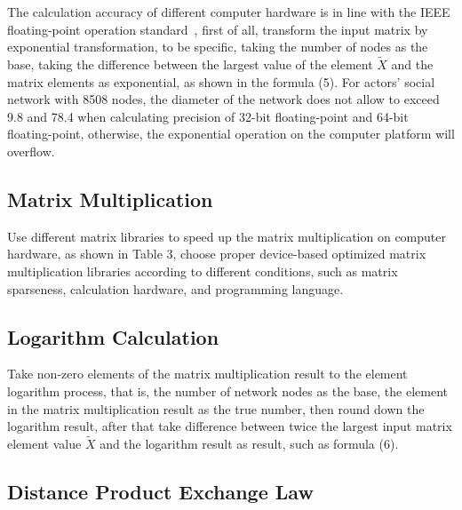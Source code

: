 \documentclass[review]{cvpr}
\begin{document}
The calculation accuracy of different computer hardware is in line with the IEEE floating-point operation standard~\cite{ieee1985ieee},
first of all, transform the input matrix by exponential transformation, to be specific, taking the number of nodes as the base,
taking the difference between the largest value of the element $\widetilde X$ and the matrix elements as exponential, as shown in the formula (5).
\eg For actors' social network with 8508 nodes, the diameter of the network does not allow to exceed 9.8 and 78.4 when calculating precision of 32-bit floating-point and 64-bit floating-point,
otherwise, the exponential operation on the computer platform will overflow.

\subsection{Matrix Multiplication}
Use different matrix libraries to speed up the matrix multiplication on computer hardware, as shown in Table 3, choose proper device-based optimized matrix multiplication libraries according to different conditions, such as matrix sparseness, calculation hardware, and programming language.

\subsection{Logarithm Calculation}
Take non-zero elements of the matrix multiplication result to the element logarithm process, that is, the number of network nodes as the base, the element in the matrix multiplication result as the true number, then round down the logarithm result,
after that take difference between twice the largest input matrix element value $\widetilde X$ and the logarithm result as result, such as formula (6).

\subsection{Distance Product Exchange Law}
\end{document}
